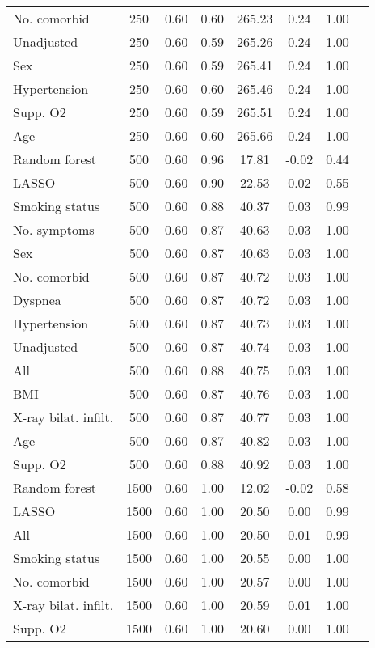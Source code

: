 \documentclass{article}
\begin{document}
{\begin{longtable}{lccccccc}
No. comorbid & 250 & 0.60 & 0.60 & 265.23 &  0.24 & 1.00 \\ 
Unadjusted & 250 & 0.60 & 0.59 & 265.26 &  0.24 & 1.00 \\ 
Sex & 250 & 0.60 & 0.59 & 265.41 &  0.24 & 1.00 \\ 
Hypertension & 250 & 0.60 & 0.60 & 265.46 &  0.24 & 1.00 \\ 
Supp. O2 & 250 & 0.60 & 0.59 & 265.51 &  0.24 & 1.00 \\ 
Age & 250 & 0.60 & 0.60 & 265.66 &  0.24 & 1.00 \\ \midrule() 
Random forest & 500 & 0.60 & 0.96 &  17.81 & -0.02 & 0.44 \\ 
LASSO & 500 & 0.60 & 0.90 &  22.53 &  0.02 & 0.55 \\ 
Smoking status & 500 & 0.60 & 0.88 &  40.37 &  0.03 & 0.99 \\ 
No. symptoms & 500 & 0.60 & 0.87 &  40.63 &  0.03 & 1.00 \\ 
Sex & 500 & 0.60 & 0.87 &  40.63 &  0.03 & 1.00 \\ 
No. comorbid & 500 & 0.60 & 0.87 &  40.72 &  0.03 & 1.00 \\ 
Dyspnea & 500 & 0.60 & 0.87 &  40.72 &  0.03 & 1.00 \\ 
Hypertension & 500 & 0.60 & 0.87 &  40.73 &  0.03 & 1.00 \\ 
Unadjusted & 500 & 0.60 & 0.87 &  40.74 &  0.03 & 1.00 \\ 
All & 500 & 0.60 & 0.88 &  40.75 &  0.03 & 1.00 \\ 
BMI & 500 & 0.60 & 0.87 &  40.76 &  0.03 & 1.00 \\ 
X-ray bilat. infilt. & 500 & 0.60 & 0.87 &  40.77 &  0.03 & 1.00 \\ 
Age & 500 & 0.60 & 0.87 &  40.82 &  0.03 & 1.00 \\ 
Supp. O2 & 500 & 0.60 & 0.88 &  40.92 &  0.03 & 1.00 \\ \midrule() 
Random forest & 1500 & 0.60 & 1.00 &  12.02 & -0.02 & 0.58 \\ 
LASSO & 1500 & 0.60 & 1.00 &  20.50 &  0.00 & 0.99 \\ 
All & 1500 & 0.60 & 1.00 &  20.50 &  0.01 & 0.99 \\ 
Smoking status & 1500 & 0.60 & 1.00 &  20.55 &  0.00 & 1.00 \\ 
No. comorbid & 1500 & 0.60 & 1.00 &  20.57 &  0.00 & 1.00 \\ 
X-ray bilat. infilt. & 1500 & 0.60 & 1.00 &  20.59 &  0.01 & 1.00 \\ 
Supp. O2 & 1500 & 0.60 & 1.00 &  20.60 &  0.00 & 1.00 \\ 

\end{longtable}}
\end{document}

